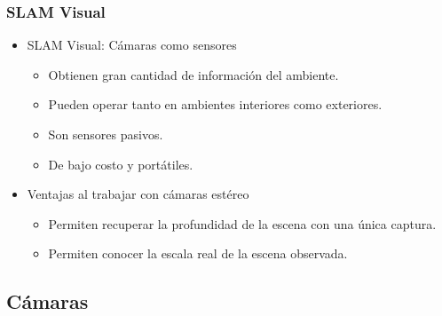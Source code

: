 \documentclass[compress]{beamer}
\begin{document}
\begin{frame}
	\frametitle{SLAM Visual}
    \begin{itemize}
        \item SLAM Visual: Cámaras como sensores
        \begin{itemize}
            \item Obtienen gran cantidad de información del ambiente.
            \item Pueden operar tanto en ambientes interiores como exteriores.
            \item Son sensores pasivos.
            \item De bajo costo y portátiles.
        \end{itemize}
    \end{itemize}
    
    \pause{}
    \begin{itemize}
        \item Ventajas al trabajar con cámaras estéreo        
        \begin{itemize}
            \item Permiten recuperar la profundidad de la escena con una única captura.
            \item Permiten conocer la escala real de la escena observada.
        \end{itemize}
    \end{itemize}
\end{frame}


\subsection{Cámaras}
\end{document}
